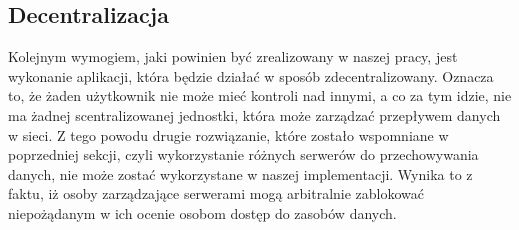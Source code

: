 \subsection{Decentralizacja}
\label{ssec:Decentralizacja}
Kolejnym wymogiem, jaki powinien być zrealizowany w naszej pracy, jest wykonanie aplikacji, która będzie działać w sposób zdecentralizowany. Oznacza to, że żaden użytkownik nie może mieć kontroli nad innymi, a co za tym idzie, nie ma żadnej scentralizowanej jednostki, która może zarządzać przepływem danych w sieci. Z tego powodu drugie rozwiązanie, które zostało wspomniane w poprzedniej sekcji, czyli wykorzystanie różnych serwerów do przechowywania danych, nie może zostać wykorzystane w naszej implementacji. Wynika to z faktu, iż osoby zarządzające serwerami mogą arbitralnie zablokować niepożądanym w ich ocenie osobom dostęp do zasobów danych.

